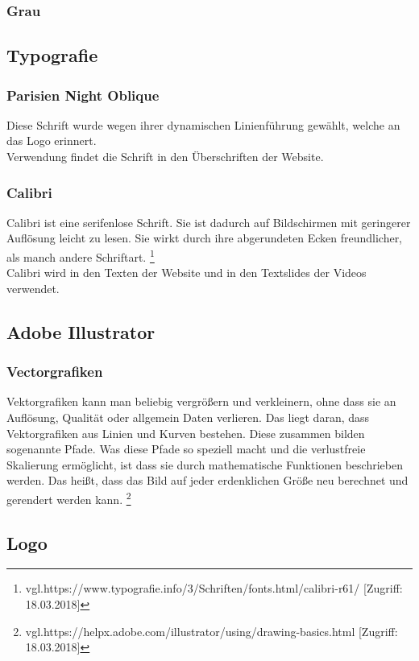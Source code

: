 \subsubsection{Grau}
\subsection{Typografie}
\subsubsection{Parisien Night Oblique}
Diese Schrift wurde wegen ihrer dynamischen Linienführung gewählt, welche an das Logo erinnert.
\\
Verwendung findet die Schrift in den Überschriften der Website.

\subsubsection{Calibri}
Calibri ist eine serifenlose Schrift. Sie ist dadurch auf Bildschirmen mit geringerer Auflösung leicht zu lesen. Sie wirkt durch ihre abgerundeten Ecken freundlicher, als manch andere Schriftart. \footnote{\label{} vgl.https://www.typografie.info/3/Schriften/fonts.html/calibri-r61/ [Zugriff: 18.03.2018]}
\\
Calibri wird in den Texten der Website und in den Textslides der Videos verwendet.

\subsection{Adobe Illustrator}
\subsubsection{Vectorgrafiken}
Vektorgrafiken kann man beliebig vergrößern und verkleinern, ohne dass sie an Auflösung, Qualität oder allgemein Daten verlieren. Das liegt daran, dass Vektorgrafiken aus Linien und Kurven bestehen. Diese zusammen bilden sogenannte Pfade. Was diese Pfade so speziell macht und die verlustfreie Skalierung ermöglicht, ist dass sie durch mathematische Funktionen beschrieben werden. Das heißt, dass das Bild auf jeder erdenklichen Größe neu berechnet und gerendert werden kann.
\footnote{\label{} vgl.https://helpx.adobe.com/illustrator/using/drawing-basics.html [Zugriff: 18.03.2018]}

\subsection{Logo}
